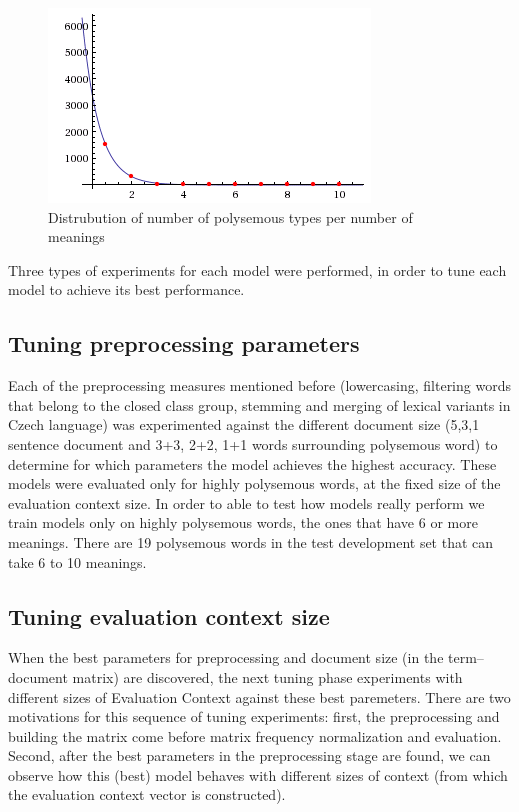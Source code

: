 \begin{figure}[h!]
\includegraphics{img/meaningTypePlot.png}
\caption{Distrubution of number of polysemous types per number of meanings}
\end{figure}


Three types of experiments for each model were performed, in order to tune each model to achieve its 
best performance.
\subsection{Tuning preprocessing parameters}
Each of the preprocessing measures mentioned before 
(lowercasing, filtering words that belong to the closed class group, stemming and merging of lexical
variants in Czech language) was experimented against the different document size (5,3,1 sentence 
document and 3+3, 2+2, 1+1 words surrounding polysemous word) to determine for which parameters the model achieves the highest accuracy. These models were evaluated only for highly polysemous
words, at the fixed size of the evaluation context size. In  order to able to test how models really perform 
we train models only on highly polysemous words, the ones that have 6 or more meanings.  There are 19 
polysemous words in the test development set that can take 6 to 10 meanings.

\subsection{Tuning evaluation context size} 
When the best parameters for preprocessing and document size (in the term--document matrix) are 
discovered, the next tuning phase experiments with different sizes of Evaluation Context against these best 
paremeters. There are two motivations for this sequence of tuning experiments: first, the preprocessing
 and building the matrix come before matrix frequency normalization and evaluation. Second, after
the best parameters in the preprocessing stage are found, we can observe how this (best) model behaves 
with different sizes of context (from which the evaluation context vector is constructed). 

